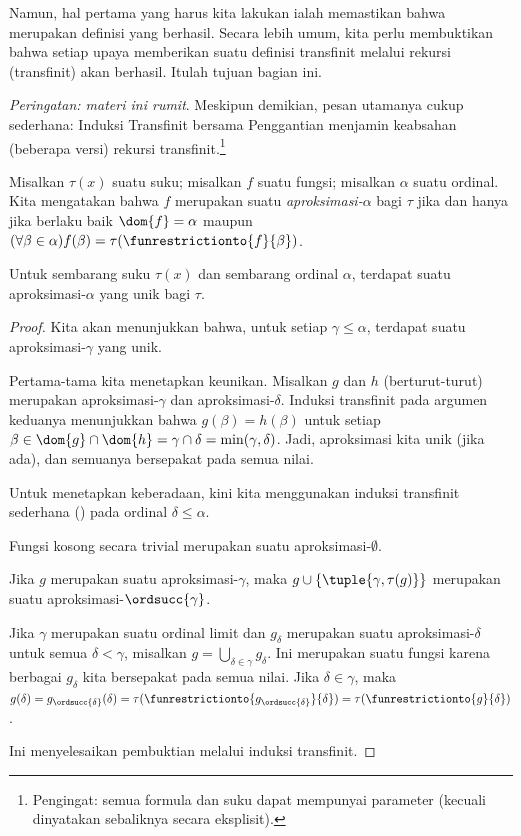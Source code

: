 \documentclass[../../../include/open-logic-section]{subfiles}
\begin{document}

Namun, hal pertama yang harus kita lakukan ialah memastikan bahwa
 merupakan definisi yang berhasil. Secara lebih
umum, kita perlu membuktikan bahwa setiap upaya memberikan suatu definisi
transfinit melalui rekursi (transfinit) akan berhasil. Itulah tujuan bagian
ini.

\emph{Peringatan: materi ini rumit}. Meskipun demikian, pesan utamanya cukup
sederhana: Induksi Transfinit bersama Penggantian menjamin keabsahan
(beberapa versi) rekursi transfinit.\footnote{Pengingat: semua formula dan
suku dapat mempunyai parameter (kecuali dinyatakan sebaliknya secara
eksplisit).}

\begin{defn}
	Misalkan $\tau(x)$ suatu suku; misalkan $f$ suatu fungsi; misalkan $\alpha$
	suatu ordinal. Kita mengatakan bahwa $f$ merupakan suatu
	\emph{aproksimasi-$\alpha$} bagi $\tau$ jika dan hanya jika berlaku baik
	$\dom{f} = \alpha$ maupun $(\forall \beta \in \alpha)f(\beta) =
	\tau(\funrestrictionto{f}{\beta})$.
\end{defn}

\begin{lem}
Untuk sembarang suku $\tau(x)$ dan sembarang ordinal $\alpha$, terdapat suatu
aproksimasi-$\alpha$ yang unik bagi $\tau$.
\end{lem}
\begin{proof}
Kita akan menunjukkan bahwa, untuk setiap $\gamma \leq \alpha$, terdapat
suatu aproksimasi-$\gamma$ yang unik.

Pertama-tama kita menetapkan keunikan. Misalkan $g$ dan $h$ (berturut-turut)
merupakan aproksimasi-$\gamma$ dan aproksimasi-$\delta$. Induksi transfinit
pada argumen keduanya menunjukkan bahwa $g(\beta) = h(\beta)$ untuk setiap
$\beta \in \dom{g} \cap \dom{h} = \gamma \cap \delta = \min(\gamma,
\delta)$. Jadi, aproksimasi kita unik (jika ada), dan semuanya bersepakat
pada semua nilai.

Untuk menetapkan keberadaan, kini kita menggunakan induksi transfinit
sederhana () pada ordinal
$\delta \leq \alpha$.

Fungsi kosong secara trivial merupakan suatu aproksimasi-$\emptyset$.

Jika $g$ merupakan suatu aproksimasi-$\gamma$, maka $g \cup
\{\tuple{\gamma, \tau(g)}\}$ merupakan suatu
aproksimasi-$\ordsucc{\gamma}$.

Jika $\gamma$ merupakan suatu ordinal limit dan $g_\delta$ merupakan suatu
aproksimasi-$\delta$ untuk semua $\delta < \gamma$, misalkan $g =
\bigcup_{\delta \in \gamma} g_\delta$. Ini merupakan suatu fungsi karena
berbagai $g_\delta$ kita bersepakat pada semua nilai. Jika $\delta \in
\gamma$, maka $g(\delta) = g_{\ordsucc{\delta}}(\delta) =
\tau(\funrestrictionto{g_{\ordsucc{\delta}}}{\delta}) =
\tau(\funrestrictionto{g}{\delta})$.

Ini menyelesaikan pembuktian melalui induksi transfinit.
\end{proof}
\end{document}
